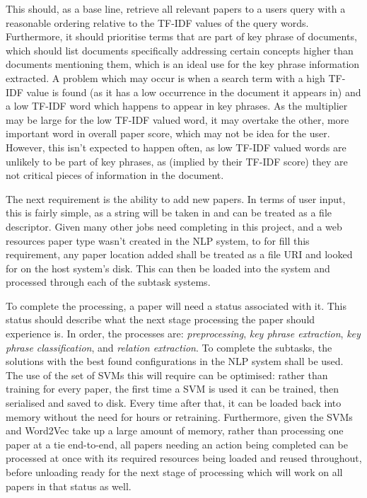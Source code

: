 This should, as a base line, retrieve all relevant papers to a users query with a reasonable ordering relative to the TF-IDF values of the query words. Furthermore, it should prioritise terms that are part of key phrase of documents, which should list documents specifically addressing certain concepts higher than documents mentioning them, which is an ideal use for the key phrase information extracted. A problem which may occur is when a search term with a high TF-IDF value is found (as it has a low occurrence in the document it appears in) and a low TF-IDF word which happens to appear in key phrases. As the multiplier may be large for the low TF-IDF valued word, it may overtake the other, more important word in overall paper score, which may not be idea for the user. However, this isn't expected to happen often, as low TF-IDF valued words are unlikely to be part of key phrases, as (implied by their TF-IDF score) they are not critical pieces of information in the document. 

The next requirement is the ability to add new papers. In terms of user input, this is fairly simple, as a string will be taken in and can be treated as a file descriptor. Given many other jobs need completing in this project, and a web resources paper type wasn't created in the NLP system, to for fill this requirement, any paper location added shall be treated as a file URI and looked for on the host system's disk. This can then be loaded into the system and processed through each of the subtask systems.

To complete the processing, a paper will need a status associated with it. This status should describe what the next stage processing the paper should experience is. In order, the processes are: \textit{preprocessing}, \textit{key phrase extraction}, \textit{key phrase classification}, and \textit{relation extraction}. To complete the subtasks, the solutions with the best found configurations in the NLP system shall be used. The use of the set of SVMs this will require can be optimised: rather than training for every paper, the first time a SVM is used it can be trained, then serialised and saved to disk. Every time after that, it can be loaded back into memory without the need for hours or retraining. Furthermore, given the SVMs and Word2Vec take up a large amount of memory, rather than processing one paper at a tie end-to-end, all papers needing an action being completed can be processed at once with its required resources being loaded and reused throughout, before unloading ready for the next stage of processing which will work on all papers in that status as well.

